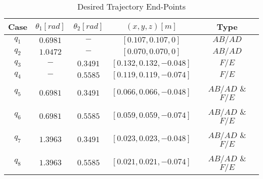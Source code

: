 \documentclass[letterpaper, 10pt, conference]{ieeeconf}      %
\begin{document}
\begin{table}[!t]
\vspace{0pt}
\centering
\caption{Desired Trajectory End-Points}
\label{table:trajec}
\vspace{-6pt}
\begin{tabular}{ccccc}
\toprule
Case & $\theta_1 [rad]$ & $\theta_2 [rad]$ & $(x,y,z) [m]$ & Type\\ \midrule
$q_1$ & $0.6981$ & $-$    & $[0.107,0.107,0]$     & $AB/AD$              \\

$q_2$ & $1.0472$ & $-$    & $[0.070,0.070,0]$    & $AB/AD$                \\

$q_3$ & $-$ & $ 0.3491$   & $[0.132,0.132, -0.048]$   & $F/E$                \\

$q_4$ & $-$ & $0.5585$    & $[0.119,0.119, -0.074]$             & $F/E$       \\

$q_5$ & $0.6981$ & $0.3491$    & $[0.066,0.066, -0.048]$      & $AB/AD$ \& $F/E$             \\

$q_6$ & $0.6981$ & $0.5585$    & $[0.059, 0.059, -0.074]$      & $AB/AD$ \& $F/E$             \\

$q_7$ & $ 1.3963$ & $0.3491$    & $[0.023, 0.023,-0.048]$      & $AB/AD$ \& $F/E$             \\

$q_8$ & $1.3963$ & $0.5585$    & $[0.021,0.021,-0.074]$         & $AB/AD$ \& $F/E$        \\
\bottomrule
\end{tabular}
\vspace{-15pt}
\end{table}  






\end{document}
